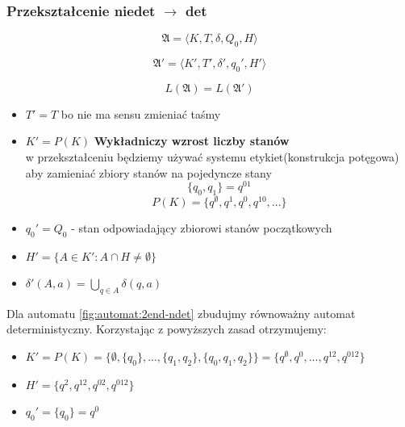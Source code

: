 \documentclass{../notatki}
\begin{document}
\subsubsection{Przekształcenie niedet \texorpdfstring{$\rightarrow$}{->} det}

$$
\mathfrak{A} = \langle K,T,\delta,Q_0,H \rangle
$$

$$
\mathfrak{A}' = \langle K',T',\delta',q_0',H' \rangle 
$$

$$
L(\mathfrak{A}) = L(\mathfrak{A}')
$$

\begin{itemize}
    \item $T' = T$ bo nie ma sensu zmieniać taśmy
    \item $K' = P(K)$ \textbf{Wykładniczy wzrost liczby stanów}\\
    w przekształceniu będziemy używać systemu etykiet(konstrukcja potęgowa) aby zamieniać zbiory stanów na pojedyncze stany
    $$
    \{q_0,q_1\} = q^{01}
    $$
    $$
    P(K) = \{q^\emptyset, q^1, q^0, q^{10}, ...\}
    $$
    \item $q_0' = Q_0$ - stan odpowiadający zbiorowi stanów początkowych
    \item $H' = \{A \in K' : A \cap H \ne \emptyset\}$
    \item $\delta'(A, a) = \bigcup_{q \in A}\delta(q, a)$
\end{itemize}

Dla automatu \ref{fig:automat:2end-ndet} zbudujmy równoważny automat deterministyczny.
Korzystając z powyższych zasad otrzymujemy:

\begin{itemize}
    \item $K' = P(K) = \{\emptyset, \{q_0\}, ..., \{q_1, q_2\}, \{q_0, q_1, q_2\}\} = \{q^\emptyset, q^0, ..., q^{12}, q^{012}\}$
    \item $H' = \{q^2, q^{12}, q^{02}, q^{012}\}$
    \item $q_0' = \{q_0\} = q^0$
\end{itemize}
\end{document}
